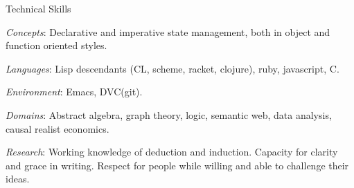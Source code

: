 \begin{rubric}{Technical Skills}{


  \entry* \emph{Concepts}: Declarative and
  imperative state management, both in object and function oriented
  styles.

  \entry* \emph{Languages}: Lisp descendants (CL, scheme, racket,
  clojure), ruby, javascript, C.

  \entry* \emph{Environment}: Emacs, DVC(git).

  \entry* \emph{Domains}: Abstract algebra, graph theory, logic,
semantic web, data analysis, causal realist economics.

  \entry* \emph{Research}: Working knowledge of deduction and
  induction. Capacity for clarity and grace in writing. Respect for
  people while willing and able to challenge their ideas.

}\end{rubric}
